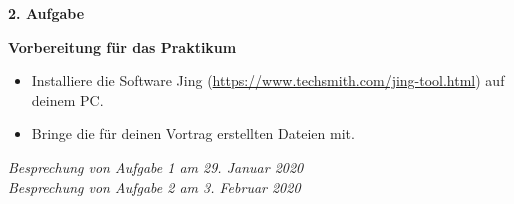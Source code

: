 \documentclass[a4paper,11pt]{scrreprt} %
\theoremstyle{definition} %
\begin{document}

\textbf{2. Aufgabe}
 


 \vspace{3ex}

\textbf{Vorbereitung für das Praktikum}
\begin{itemize}
    \item Installiere die Software Jing (\url{https://www.techsmith.com/jing-tool.html}) auf deinem PC.
    \item Bringe die für deinen Vortrag erstellten Dateien mit.
\end{itemize}




\vspace*{\fill} %

\begin{flushright}
\textit{Besprechung von Aufgabe 1 am 29. Januar 2020\\
        Besprechung von Aufgabe 2 am 3. Februar 2020}
\end{flushright}
\end{document}
